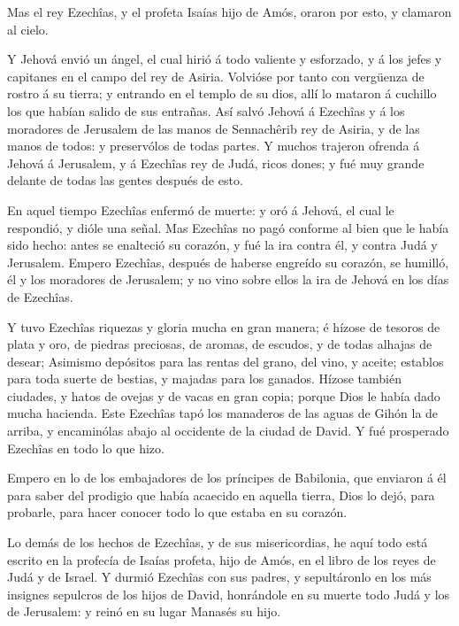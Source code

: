  Mas el rey Ezechîas, y el profeta Isaías hijo de Amós,
oraron por esto, y clamaron al cielo.

 Y Jehová envió un ángel, el cual hirió á todo valiente y
esforzado, y á los jefes y capitanes en el campo del rey de Asiria.
Volvióse por tanto con vergüenza de rostro á su tierra; y entrando en el
templo de su dios, allí lo mataron á cuchillo los que habían salido de
sus entrañas.  Así salvó Jehová á Ezechîas y á los
moradores de Jerusalem de las manos de Sennachêrib rey de Asiria, y de
las manos de todos: y preservólos de todas partes.  Y
muchos trajeron ofrenda á Jehová á Jerusalem, y á Ezechîas rey de Judá,
ricos dones; y fué muy grande delante de todas las gentes después de
esto.

 En aquel tiempo Ezechîas enfermó de muerte: y oró á
Jehová, el cual le respondió, y dióle una señal.  Mas
Ezechîas no pagó conforme al bien que le había sido hecho: antes se
enalteció su corazón, y fué la ira contra él, y contra Judá y Jerusalem.
 Empero Ezechîas, después de haberse engreído su corazón,
se humilló, él y los moradores de Jerusalem; y no vino sobre ellos la
ira de Jehová en los días de Ezechîas.

 Y tuvo Ezechîas riquezas y gloria mucha en gran manera; é
hízose de tesoros de plata y oro, de piedras preciosas, de aromas, de
escudos, y de todas alhajas de desear;  Asimismo depósitos
para las rentas del grano, del vino, y aceite; establos para toda suerte
de bestias, y majadas para los ganados.  Hízose también
ciudades, y hatos de ovejas y de vacas en gran copia; porque Dios le
había dado mucha hacienda.  Este Ezechîas tapó los
manaderos de las aguas de Gihón la de arriba, y encaminólas abajo al
occidente de la ciudad de David. Y fué prosperado Ezechîas en todo lo
que hizo.

 Empero en lo de los embajadores de los príncipes de
Babilonia, que enviaron á él para saber del prodigio que había acaecido
en aquella tierra, Dios lo dejó, para probarle, para hacer conocer todo
lo que estaba en su corazón.

 Lo demás de los hechos de Ezechîas, y de sus
misericordias, he aquí todo está escrito en la profecía de Isaías
profeta, hijo de Amós, en el libro de los reyes de Judá y de Israel.
 Y durmió Ezechîas con sus padres, y sepultáronlo en los
más insignes sepulcros de los hijos de David, honrándole en su muerte
todo Judá y los de Jerusalem: y reinó en su lugar Manasés su hijo.

